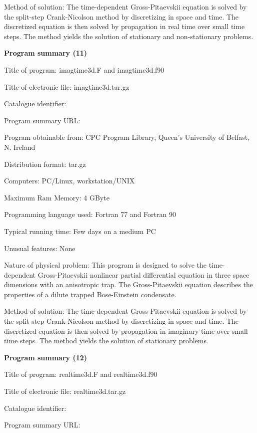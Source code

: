 \documentclass[onecolumn]{elsart3p}
\begin{document}
Method of solution: The time-dependent Gross-Pitaevskii equation is 
solved by the split-step Crank-Nicolson method by discretizing in space 
and time. The discretized equation is then solved by propagation in 
real time over small time steps.  The method yields the solution of 
stationary and non-stationary problems.  


{\bf Program summary (11)}

Title of program: imagtime3d.F and imagtime3d.f90

Title of electronic file: imagtime3d.tar.gz


Catalogue identifier:

Program summary URL: 

Program obtainable from: CPC Program Library, Queen's University of 
Belfast, N. Ireland

Distribution format: tar.gz

Computers: PC/Linux, workstation/UNIX

Maximum Ram Memory: 4 GByte

Programming language used: Fortran 77 and Fortran 90




Typical running time: Few days on a medium PC

Unusual features: None

Nature of physical problem: This program is designed to solve the
time-dependent Gross-Pitaevskii nonlinear partial differential equation
in three space dimensions with an anisotropic trap. The Gross-Pitaevskii
equation describes the properties of a dilute trapped Bose-Einstein
condensate.


Method of solution: The time-dependent Gross-Pitaevskii equation is 
solved by the split-step Crank-Nicolson method by discretizing in space 
and time. The discretized equation is then solved by propagation in 
imaginary time over small time steps.  The method yields the solution of 
stationary problems.  


{\bf Program summary (12)}

Title of program: realtime3d.F and realtime3d.f90

Title of electronic file: realtime3d.tar.gz


Catalogue identifier:

Program summary URL: 
\end{document}
